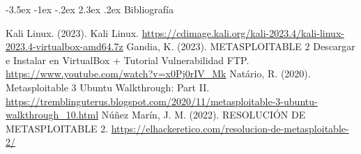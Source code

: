 \documentclass[11pt]{report}
\makeatletter
\renewcommand\chapter{\@startsection{chapter}{0}{\z@}%
    {-3.5ex \@plus -1ex \@minus -.2ex}%
    {2.3ex \@plus.2ex}%
    {\normalfont\Large\bfseries}}
\makeatother
\begin{document}
\newpage

\chapter{Bibliografía} %
\begin{thebibliography}{99}
   Kali Linux. (2023). Kali Linux. \url{https://cdimage.kali.org/kali-2023.4/kali-linux-2023.4-virtualbox-amd64.7z}
   Gandia, K. (2023). METASPLOITABLE 2 Descargar e Instalar en VirtualBox + Tutorial Vulnerabilidad FTP. \url{https://www.youtube.com/watch?v=x0Pj0rIV_Mk}
   Natário, R. (2020). Metasploitable 3 Ubuntu Walkthrough: Part II. \url{https://tremblinguterus.blogspot.com/2020/11/metasploitable-3-ubuntu-walkthrough_10.html}
   Núñez Marín, J. M. (2022). RESOLUCIÓN DE METASPLOITABLE 2. \url{https://elhackeretico.com/resolucion-de-metasploitable-2/}
\end{thebibliography}
\end{document}
